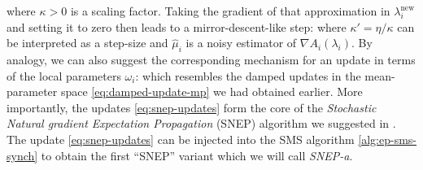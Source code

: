 %
%
where $\kappa>0$ is a scaling factor. Taking the gradient of that approximation in $\lambda_i^{\text{new}}$ and setting it to zero then leads to a mirror-descent-like step:
%
%
where $\kappa'=\eta/\kappa$ can be interpreted as a step-size and $\hat\mu_i$ is a noisy estimator of $\nabla A_i(\lambda_i)$. By analogy, we can also suggest the corresponding mechanism for an update in terms of the local parameters $\omega_i$: 
%
%
which resembles the damped updates in the mean-parameter space \eqref{eq:damped-update-mp} we had obtained earlier. 
More importantly, the updates \eqref{eq:snep-updates} form the core of the \emph{Stochastic Natural gradient Expectation Propagation} (SNEP) algorithm we suggested in \citet{hasenclever16}.
The update \eqref{eq:snep-updates} can be injected into the SMS algorithm \ref{alg:ep-sms-synch} to obtain the first ``SNEP'' variant which we will call \emph{SNEP-a}. 
 



%
%
%

